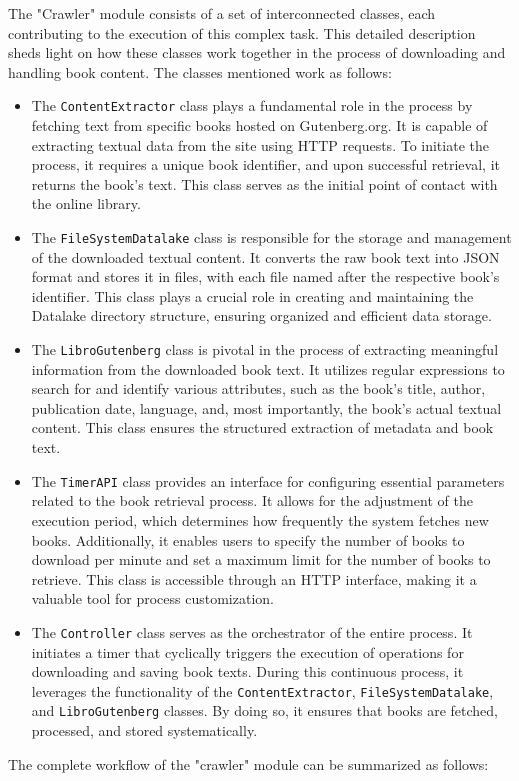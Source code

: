\documentclass{article}
\begin{document}
The "Crawler" module consists of a set of interconnected classes, each contributing to the execution of this complex task. This detailed description sheds light on how these classes work together in the process of downloading and handling book content.
The classes mentioned work as follows:
\begin{itemize}
\item
The \texttt{ContentExtractor} class plays a fundamental role in the process by fetching text from specific books hosted on Gutenberg.org. It is capable of extracting textual data from the site using HTTP requests. To initiate the process, it requires a unique book identifier, and upon successful retrieval, it returns the book's text. This class serves as the initial point of contact with the online library.
\item
The \texttt{FileSystemDatalake} class is responsible for the storage and management of the downloaded textual content. It converts the raw book text into JSON format and stores it in files, with each file named after the respective book's identifier. This class plays a crucial role in creating and maintaining the Datalake directory structure, ensuring organized and efficient data storage.
\item
The \texttt{LibroGutenberg} class is pivotal in the process of extracting meaningful information from the downloaded book text. It utilizes regular expressions to search for and identify various attributes, such as the book's title, author, publication date, language, and, most importantly, the book's actual textual content. This class ensures the structured extraction of metadata and book text.
\item
The \texttt{TimerAPI} class provides an interface for configuring essential parameters related to the book retrieval process. It allows for the adjustment of the execution period, which determines how frequently the system fetches new books. Additionally, it enables users to specify the number of books to download per minute and set a maximum limit for the number of books to retrieve. This class is accessible through an HTTP interface, making it a valuable tool for process customization.
\item
The \texttt{Controller} class serves as the orchestrator of the entire process. It initiates a timer that cyclically triggers the execution of operations for downloading and saving book texts. During this continuous process, it leverages the functionality of the \texttt{ContentExtractor}, \texttt{FileSystemDatalake}, and \texttt{LibroGutenberg} classes. By doing so, it ensures that books are fetched, processed, and stored systematically.
\end{itemize}
The complete workflow of the "crawler" module can be summarized as follows:
\end{document}
